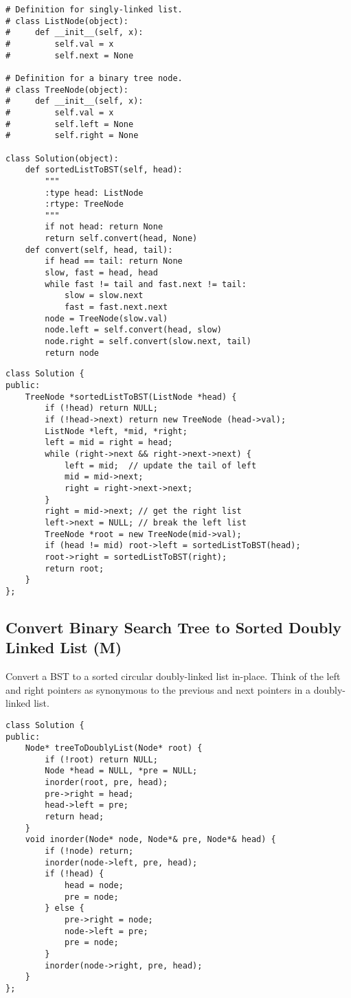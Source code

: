 \begin{lstlisting}
# Definition for singly-linked list.
# class ListNode(object):
#     def __init__(self, x):
#         self.val = x
#         self.next = None

# Definition for a binary tree node.
# class TreeNode(object):
#     def __init__(self, x):
#         self.val = x
#         self.left = None
#         self.right = None

class Solution(object):
    def sortedListToBST(self, head):
        """
        :type head: ListNode
        :rtype: TreeNode
        """
        if not head: return None
        return self.convert(head, None)
    def convert(self, head, tail):
        if head == tail: return None
        slow, fast = head, head
        while fast != tail and fast.next != tail:
            slow = slow.next
            fast = fast.next.next
        node = TreeNode(slow.val)
        node.left = self.convert(head, slow)
        node.right = self.convert(slow.next, tail)
        return node
\end{lstlisting}
        

\begin{lstlisting}
class Solution {
public:
    TreeNode *sortedListToBST(ListNode *head) {
        if (!head) return NULL;
        if (!head->next) return new TreeNode (head->val);
        ListNode *left, *mid, *right;
        left = mid = right = head;
        while (right->next && right->next->next) {
            left = mid;  // update the tail of left
            mid = mid->next;
            right = right->next->next;
        }
        right = mid->next; // get the right list
        left->next = NULL; // break the left list
        TreeNode *root = new TreeNode(mid->val);
        if (head != mid) root->left = sortedListToBST(head);
        root->right = sortedListToBST(right);
        return root;
    }
};
\end{lstlisting}

	
\subsection{Convert Binary Search Tree to Sorted Doubly Linked List (M)}

Convert a BST to a sorted circular doubly-linked list in-place. Think of the left and right pointers as synonymous to the previous and next pointers in a doubly-linked list.

\begin{lstlisting}
class Solution {
public:
    Node* treeToDoublyList(Node* root) {
        if (!root) return NULL;
        Node *head = NULL, *pre = NULL;
        inorder(root, pre, head);
        pre->right = head;
        head->left = pre;
        return head;
    }
    void inorder(Node* node, Node*& pre, Node*& head) {
        if (!node) return;
        inorder(node->left, pre, head);
        if (!head) {
            head = node;
            pre = node;
        } else {
            pre->right = node;
            node->left = pre;
            pre = node;
        }
        inorder(node->right, pre, head);
    }
};
\end{lstlisting}


